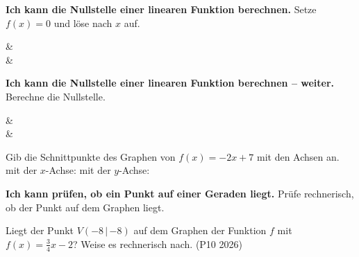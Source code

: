 \begin{aufgabe}{\textbf{Ich kann die Nullstelle einer linearen Funktion berechnen.} Setze $f(x) = 0$ und löse nach $x$ auf.}
\begin{gleichungsraster}[3]
 &  \\
 &  \\
\end{gleichungsraster}
\end{aufgabe}

\begin{aufgabe}{\textbf{Ich kann die Nullstelle einer linearen Funktion berechnen – weiter.} Berechne die Nullstelle.}
\setcounter{teil}{4}
\begin{gleichungsraster}[3]
 &  \\
 & \\
\end{gleichungsraster}
\vspace{4mm}
\begin{teile}
\teil Gib die Schnittpunkte des Graphen von $f(x) = -2x + 7$ mit den Achsen an. \\ mit der $x$-Achse: \leerfeld \quad mit der $y$-Achse: \leerfeld
\end{teile}
\end{aufgabe}

\begin{aufgabe}{\textbf{Ich kann prüfen, ob ein Punkt auf einer Geraden liegt.} Prüfe rechnerisch, ob der Punkt auf dem Graphen liegt.}
\begin{teile}
\teil Liegt der Punkt $V(-8\,|\,{-8})$ auf dem Graphen der Funktion $f$ mit $f(x) = \frac{3}{4}x - 2$? Weise es rechnerisch nach. (P10 2026)
\end{teile}
\end{aufgabe}

